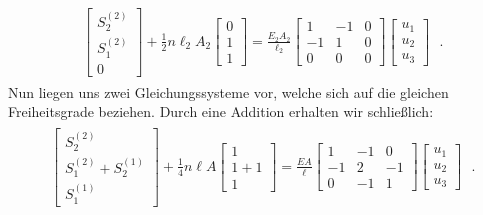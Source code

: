 \documentclass[letterpaper,10pt,german]{jupyterBook}
\begin{document}
\begin{equation}\label{equation:chapters/chapter2/1dFEM:stabFEM6}
\begin{split}\begin{align}
\begin{bmatrix}
S_2^{(2)} \\
S_1^{(2)} \\
0
\end{bmatrix} + \frac{1}{2}n\ell_2 A_2 \begin{bmatrix}
0 \\
1\\
1
\end{bmatrix} = \frac{E_2A_2}{\ell_2}\begin{bmatrix}
1 & -1 & 0\\
-1 & 1 & 0\\
0 & 0 & 0
\end{bmatrix} \begin{bmatrix}
u_1 \\
u_2\\
u_3
\end{bmatrix}
\end{align} \; .\end{split}
\end{equation}
\sphinxAtStartPar
Nun liegen uns zwei Gleichungssysteme vor, welche sich auf die gleichen Freiheitsgrade beziehen. Durch eine Addition erhalten wir schließlich:
\begin{equation}\label{equation:chapters/chapter2/1dFEM:stabFEM7}
\begin{split}\begin{align}
\begin{bmatrix}
S_2^{(2)} \\
S_1^{(2)} + S_2^{(1)} \\
S_1^{(1)}
\end{bmatrix} + \frac{1}{4}n\ell A \begin{bmatrix}
1 \\
1+1\\
1
\end{bmatrix} = \frac{EA}{\ell}\begin{bmatrix}
1 & -1 & 0\\
-1 & 2 & -1\\
0 & -1 & 1
\end{bmatrix} \begin{bmatrix}
u_1 \\
u_2\\
u_3
\end{bmatrix}
\end{align} \; .\end{split}
\end{equation}
\end{document}
